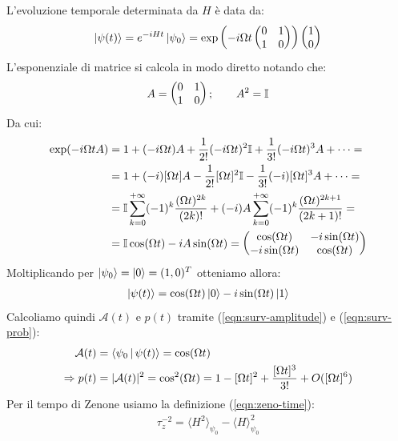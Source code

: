 \documentclass[../../InformazioneQuantistica.tex]{subfiles}
\begin{document}
L'evoluzione temporale determinata da $H$ è data da:
\begin{align*}
\Ket{\psi(t)} = e^{-iHt} \Ket{\psi_0} = \exp\left(-i\Omega t\begin{pmatrix}
0 & 1\\1 & 0\end{pmatrix}\right) \begin{pmatrix} 1 \\ 0 \end{pmatrix}
\end{align*}
L'esponenziale di matrice si calcola in modo diretto notando che:
\begin{align*}
A=\begin{pmatrix}0 & 1\\1 & 0\end{pmatrix}; \qquad A^2 = \mathbb{I}
\end{align*}
Da cui:
\begin{align*}
\exp(-i\Omega t A) &= 1 +(-i\Omega t)A + \frac{1}{2!}(-i\Omega t)^2 \mathbb{I} + \frac{1}{3!}(-i\Omega t)^3 A + \dots =\\
&= 1 +(-i)[\Omega t] A -\frac{1}{2!}[\Omega t]^2 \mathbb{I} - \frac{1}{3!}(-i)[\Omega t]^3 A +\dots =\\
&=\mathbb{I}\sum_{k=0}^{+\infty} (-1)^k \frac{(\Omega t)^{2k}}{(2k)!} + (-i)A \sum_{k=0}^{+\infty} (-1)^k \frac{(\Omega t)^{2k+1}}{(2k+1)!}=\\ &= \mathbb{I}\cos(\Omega t)-iA\sin(\Omega t) = \begin{pmatrix}
\cos(\Omega t) & -i\sin(\Omega t)\\
-i\sin(\Omega t) & \cos(\Omega t)\end{pmatrix}
\end{align*}
Moltiplicando per $\Ket{\psi_0}=\Ket{0}=(1,0)^T$ otteniamo allora:
\begin{align*}
\Ket{\psi(t)}=\cos(\Omega t)\Ket{0} -i\sin(\Omega t)\Ket{1}
\end{align*}
Calcoliamo quindi $\mathcal{A}(t)$ e $p(t)$ tramite (\ref{eqn:surv-amplitude}) e (\ref{eqn:surv-prob}):
\begin{align*}
\mathcal{A}(t) &= \Braket{\psi_0|\psi(t)}= \cos(\Omega t)\\
\Rightarrow p(t) &= |\mathcal{A}(t)|^2 =\cos^2 (\Omega t) = 1 - [\Omega t]^2 + \frac{[\Omega t]^3}{3!} + O([\Omega t]^6)
\end{align*}
Per il tempo di Zenone usiamo la definizione (\ref{eqn:zeno-time}):
\begin{align*}
\tau_z^{-2} = \langle H^2 \rangle_{\psi_0}-\langle H \rangle_{\psi_0}^2
\end{align*}
\end{document}
